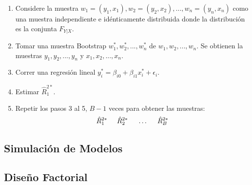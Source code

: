 \begin{enumerate}
	\item Considere la muestra $ w_{1} = (y_{1}, x_{1}),  w_{2} = (y_{2}, x_{2}), ..., w_{n} = (y_{n}, x_{n})$ como una muestra independiente e idénticamente distribuida donde la distribución es la conjunta $ F_{Y|X} $.
	
	\item  Tomar una muestra Bootstrap  $ w^{*}_{1}, w^{*}_{2},...,  w^{*}_{n} $ de $w_{1}, w_{2},...,  w_{n} $. Se obtienen la muestras  $y_{1}, y_{2},...,  y_{n} $ y  $x_{1}, x_{2},...,  x_{n} $.
	
	\item Correr una regresión lineal $ y^{*}_{i} = \beta_{i0} +\beta_{i1}x_{i}^{*} + \epsilon_{i} $.
	
	\item Estimar  $ \hat{R}^{2*}_{1} $.
	
	\item  Repetir los pasos 3 al 5, $B - 1$ veces para obtener las muestras: 
	\[
	\hat{R}^{2*}_{1} \hspace{.5cm} \hat{R}^{2*}_{2} \hspace{.5cm} \dots \hspace{.5cm} \hat{R}^{2*}_{B}
	\]
\end{enumerate}






\subsection{Simulación de Modelos}

\subsection{Diseño Factorial}